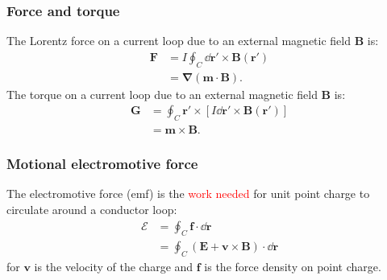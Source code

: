 \documentclass{article}
\newcommand{\vc}[1]{\boldsymbol{#1}}
\begin{document}
\begin{multicols*}{3}
\subsubsection*{Force and torque}
The Lorentz force on a current loop due to an
external magnetic field $\vc{B}$ is:
\begin{align*}
    \vc{F}
    &=I\oint_C\dd\vc{r}'\times\vc{B}(\vc{r}') \\
    &=\vc{\nabla}(\vc{m}\cdot\vc{B}).
\end{align*}
The torque on a current loop due to an
external magnetic field $\vc{B}$ is:
\begin{align*}
    \vc{G}
    &=\oint_C\vc{r}'\times[I\dd\vc{r}'\times\vc{B}(\vc{r}')] \\
    &=\vc{m}\times\vc{B}.
\end{align*}

\subsubsection*{Motional electromotive force}
The electromotive force (emf) is the \textcolor{red}{work needed} 
for unit point charge to circulate around a conductor loop:
\begin{align*}
    \mathcal{E}
    &=\oint_C\vc{f}\cdot\dd\vc{r} \\
    &=\oint_C(\vc{E}+\vc{v}\times\vc{B})\cdot\dd\vc{r}
\end{align*}
for $\vc{v}$ is the velocity of the charge
and $\vc{f}$ is the force density on point charge.


\end{multicols*}
\end{document}
